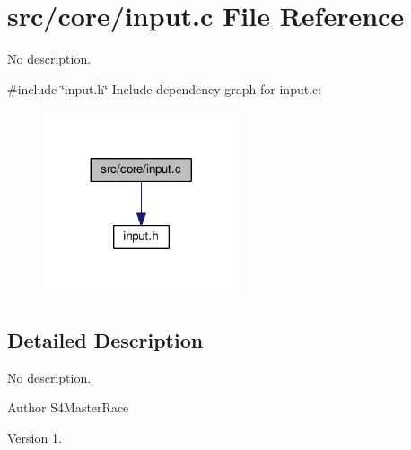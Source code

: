 \section{src/core/input.c File Reference}
\label{input_8c}


No description.  


{\ttfamily \#include \char`\"{}input.\+h\char`\"{}}\newline
Include dependency graph for input.\+c\+:
\nopagebreak
\begin{figure}[H]
\begin{center}
\leavevmode
\includegraphics[width=164pt]{input_8c__incl}
\end{center}
\end{figure}


\subsection{Detailed Description}
No description. 

\begin{DoxyAuthor}{Author}
S4\+Master\+Race 
\end{DoxyAuthor}
\begin{DoxyVersion}{Version}
1. 
\end{DoxyVersion}
